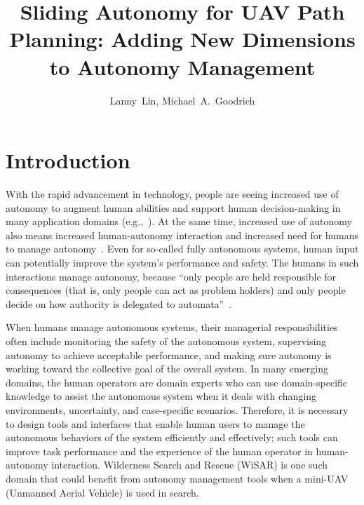 \documentclass[lettersize, apacite, twoside, HRI]{apa_HRI}
\title{Sliding Autonomy for UAV Path Planning: Adding New Dimensions to Autonomy Management}
\author{Lanny~Lin, Michael~A.~Goodrich}
\affiliation{Brigham Young University}
\begin{document}
\maketitle

\section{Introduction}
\label{sec:Introduction6}

With the rapid advancement in technology, people are seeing increased use of autonomy to augment human abilities and support human decision-making in many application domains (e.g.,~\cite{Chun2010Limousine,Casper2003Human,Lin2010Supporting,Robins2009From}). At the same time, increased use of autonomy also means increased human-autonomy interaction and increased need for humans to manage autonomy~\cite{Bainbridge1983Ironies}. Even for so-called fully autonomous systems, human input can potentially improve the system's performance and safety. The humans in such interactions manage autonomy, because ``only people are held responsible for consequences (that is, only people can act as problem holders) and only people decide on how authority is delegated to automata''~\cite{Woods2006Joint,Bradshaw2013Seven}.

When humans manage autonomous systems, their managerial responsibilities often include monitoring the safety of the autonomous system, supervising autonomy to achieve acceptable performance, and making sure autonomy is working toward the collective goal of the overall system. In many emerging domains, the human operators are domain experts who can use domain-specific knowledge to assist the autonomous system when it deals with changing environments, uncertainty, and case-specific scenarios. Therefore, it is necessary to design tools and interfaces that enable human users to manage the autonomous behaviors of the system efficiently and effectively; such tools can improve task performance and the experience of the human operator in human-autonomy interaction. Wilderness Search and Rescue (WiSAR) is one such domain that could benefit from autonomy management tools when a mini-UAV (Unmanned Aerial Vehicle) is used in search.
\end{document}
